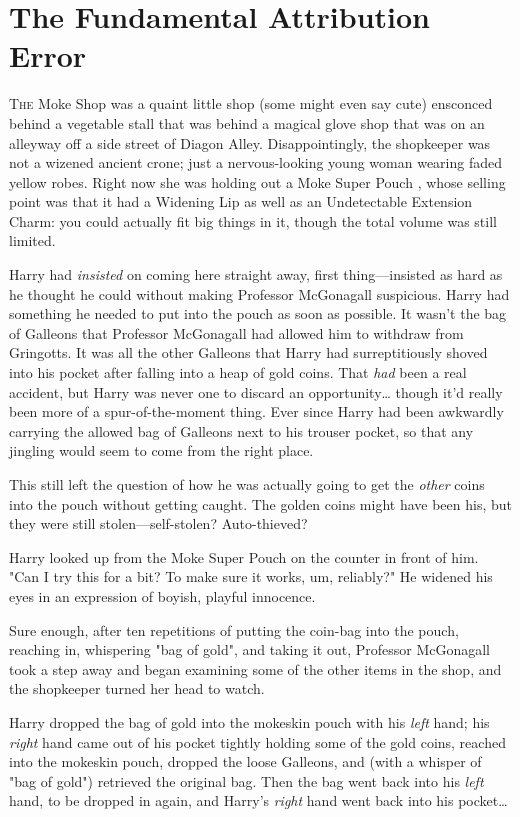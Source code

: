 \chapter{The Fundamental Attribution Error}

\lettrine{T}{he} Moke Shop was a quaint little shop (some might even say cute) ensconced 
behind a vegetable stall that was behind a magical glove shop that was on an 
alleyway off a side street of Diagon Alley. Disappointingly, the shopkeeper was 
not a wizened ancient crone; just a nervous-looking young woman wearing faded 
yellow robes. Right now she was holding out a Moke Super Pouch , whose 
selling point was that it had a Widening Lip as well as an Undetectable 
Extension Charm: you could actually fit big things in it, though the total 
volume was still limited.

Harry had \emph{insisted} on coming here straight away, first thing---insisted 
as hard as he thought he could without making Professor McGonagall suspicious. 
Harry had something he needed to put into the pouch as soon as possible. It 
wasn't the bag of Galleons that Professor McGonagall had allowed him to 
withdraw from Gringotts. It was all the other Galleons that Harry had 
surreptitiously shoved into his pocket after falling into a heap of gold coins. 
That \emph{had} been a real accident, but Harry was never one to discard an 
opportunity{\ldots} though it'd really been more of a spur-of-the-moment thing. 
Ever since Harry had been awkwardly carrying the allowed bag of Galleons next 
to his trouser pocket, so that any jingling would seem to come from the right 
place.

This still left the question of how he was actually going to get the 
\emph{other} coins into the pouch without getting caught. The golden coins 
might have been his, but they were still stolen---self-stolen? Auto-thieved?

Harry looked up from the Moke Super Pouch  on the counter in front of him. 
"Can I try this for a bit? To make sure it works, um, reliably?" He widened his 
eyes in an expression of boyish, playful innocence.

Sure enough, after ten repetitions of putting the coin-bag into the pouch, 
reaching in, whispering "bag of gold", and taking it out, Professor McGonagall 
took a step away and began examining some of the other items in the shop, and 
the shopkeeper turned her head to watch.

Harry dropped the bag of gold into the mokeskin pouch with his \emph{left} 
hand; his \emph{right} hand came out of his pocket tightly holding some of the 
gold coins, reached into the mokeskin pouch, dropped the loose Galleons, and 
(with a whisper of "bag of gold") retrieved the original bag. Then the bag went 
back into his \emph{left} hand, to be dropped in again, and Harry's 
\emph{right} hand went back into his pocket{\ldots}

